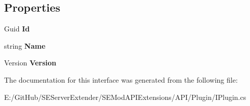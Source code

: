 \subsection*{Properties}
\begin{DoxyCompactItemize}
\item 
\hypertarget{interface_s_e_mod_a_p_i_extensions_1_1_a_p_i_1_1_plugin_1_1_i_plugin_a084226e4a50c358eef14c8de40ec5174}{}Guid {\bfseries Id}\label{interface_s_e_mod_a_p_i_extensions_1_1_a_p_i_1_1_plugin_1_1_i_plugin_a084226e4a50c358eef14c8de40ec5174}

\item 
\hypertarget{interface_s_e_mod_a_p_i_extensions_1_1_a_p_i_1_1_plugin_1_1_i_plugin_a0207bb674ced0b690e25dff6354ac6e5}{}string {\bfseries Name}\label{interface_s_e_mod_a_p_i_extensions_1_1_a_p_i_1_1_plugin_1_1_i_plugin_a0207bb674ced0b690e25dff6354ac6e5}

\item 
\hypertarget{interface_s_e_mod_a_p_i_extensions_1_1_a_p_i_1_1_plugin_1_1_i_plugin_ad5fe4dafe7d7695d4b88f135cf9425e5}{}Version {\bfseries Version}\label{interface_s_e_mod_a_p_i_extensions_1_1_a_p_i_1_1_plugin_1_1_i_plugin_ad5fe4dafe7d7695d4b88f135cf9425e5}

\end{DoxyCompactItemize}


The documentation for this interface was generated from the following file\+:\begin{DoxyCompactItemize}
\item 
E\+:/\+Git\+Hub/\+S\+E\+Server\+Extender/\+S\+E\+Mod\+A\+P\+I\+Extensions/\+A\+P\+I/\+Plugin/I\+Plugin.\+cs\end{DoxyCompactItemize}

